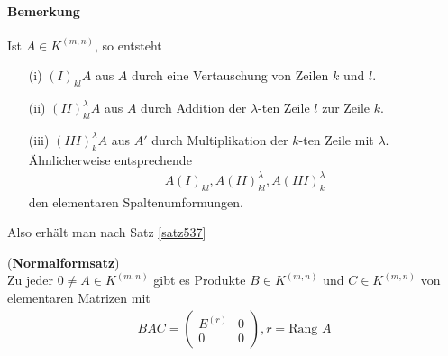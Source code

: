 \documentclass[11pt]{report}
\newcommand*\f[1] {\textbf{#1}}
\begin{document}
\paragraph{Bemerkung}
Ist $A \in K^{(m,n)}$, so entsteht
\begin{itemize}
\item[(i)] $(I)_{kl} A$ aus $A$ durch eine Vertauschung von Zeilen $k$ und $l$.
\item[(ii)] $(II)^{\lambda}_{kl} A$ aus $A$ durch Addition der $\lambda$-ten Zeile $l$ zur Zeile $k$.
\item[(iii)] $(III)^{\lambda}_{k} A$ aus $A'$ durch Multiplikation der $k$-ten Zeile mit $\lambda$.
Ähnlicherweise entsprechende
\begin{align}
A(I)_{kl}, A(II)^{\lambda}_{kl}, A(III)^{\lambda}_{k}
\end{align}
den elementaren Spaltenumformungen.
\end{itemize}

\newpage
Also erhält man nach Satz \ref{satz537} \\
\begin{satz} (\f{Normalformsatz})\\
\label{satz539}
Zu jeder $0 \neq A \in K^{(m,n)}$ gibt es Produkte $B \in K^{(m,n)}$ und $C \in  K^{(m,n)}$ von elementaren Matrizen mit
\begin{align}
BAC = \begin{pmatrix} E^{(r)} & 0 \\ 0 & 0 \end{pmatrix}, r = \text{Rang } A
\end{align}
\end{satz}
\end{document}
